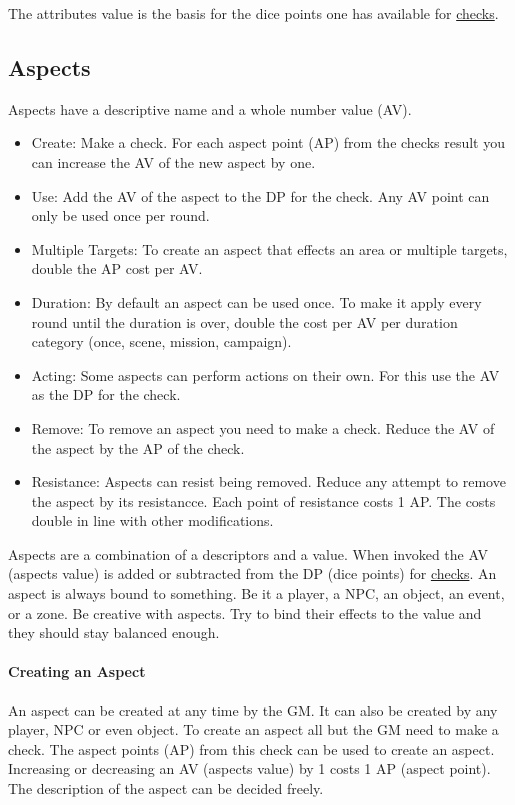 \documentclass[11pt]{article}
\begin{document}
{The attributes value is the basis for the dice points one has available for \hyperref[sec:org09241a8]{checks}. 
\subsection{Aspects}
\label{sec:org48de6b9}
\begin{short}
Aspects have a descriptive name and a whole number value (AV).
\begin{itemize}
\item Create: Make a check. For each aspect point (AP) from the checks result you can increase the AV of the new aspect by one.
\item Use: Add the AV of the aspect to the DP for the check. Any AV point can only be used once per round.
\item Multiple Targets: To create an aspect that effects an area or multiple targets, double the AP cost per AV.
\item Duration: By default an aspect can be used once. To make it apply every round until the duration is over, double the cost per AV per duration category (once, scene, mission, campaign).
\item Acting: Some aspects can perform actions on their own. For this use the AV as the DP for the check.
\item Remove: To remove an aspect you need to make a check. Reduce the AV of the aspect by the AP of the check.
\item Resistance: Aspects can resist being removed. Reduce any attempt to remove the aspect by its resistancce. Each point of resistance costs 1 AP. The costs double in line with other modifications.
\end{itemize}
\end{short}

Aspects are a combination of a descriptors and a value. When invoked the AV (aspects value) is added or subtracted from the DP (dice points) for \hyperref[sec:org09241a8]{checks}. An aspect is always bound to something. Be it a player, a NPC, an object, an event, or a zone. Be creative with aspects. Try to bind their effects to the value and they should stay balanced enough.
\paragraph*{Creating an Aspect}
\label{sec:org9fffe9e}

An aspect can be created at any time by the GM. It can also be created by any player, NPC or even object. To create an aspect all but the GM need to make a check. The aspect points (AP) from this check can be used to create an aspect. Increasing or decreasing an AV (aspects value) by 1 costs 1 AP (aspect point). The description of the aspect can be decided freely. 

}
\end{document}
